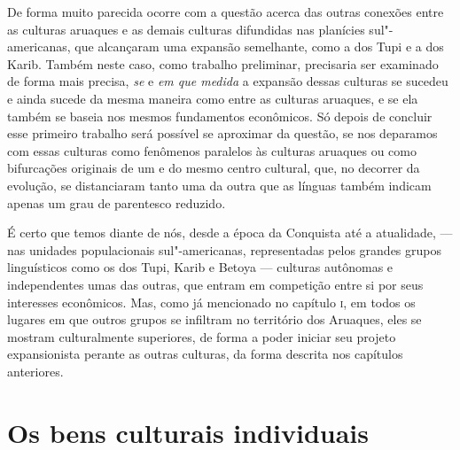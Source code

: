 De forma muito parecida ocorre com a questão acerca das outras conexões
entre as culturas aruaques e as demais culturas difundidas nas planícies
sul"-americanas, que alcançaram uma expansão semelhante, como a dos Tupi
e a dos Karib. Também neste caso, como trabalho preliminar, precisaria
ser examinado de forma mais precisa, \textit{se} e \textit{em que medida} a
expansão dessas culturas se sucedeu e ainda sucede da mesma maneira
como entre as culturas aruaques, e se ela também se baseia nos mesmos
fundamentos econômicos. Só depois de concluir esse primeiro trabalho 
será possível se aproximar da questão, se nos deparamos com essas
culturas como fenômenos paralelos às culturas aruaques ou como
bifurcações originais de um e do mesmo centro cultural, que, no decorrer
da evolução, se distanciaram tanto uma da outra que as línguas também
indicam apenas um grau de parentesco reduzido.

É certo que temos diante de nós, desde a época da Conquista até a atualidade,
--- nas unidades populacionais sul"-americanas, representadas pelos
grandes grupos linguísticos como os dos Tupi, Karib e Betoya --- culturas
autônomas e independentes umas das outras, que entram em competição
entre si por seus interesses econômicos. Mas,
como já mencionado no capítulo \textsc{i}, em todos os lugares em que outros
grupos se infiltram no território dos Aruaques, eles se mostram
culturalmente superiores, de forma a poder iniciar seu projeto
expansionista perante as outras culturas, da forma descrita nos
capítulos anteriores.

\chapter*{Os bens culturais individuais\smallskip{}}


